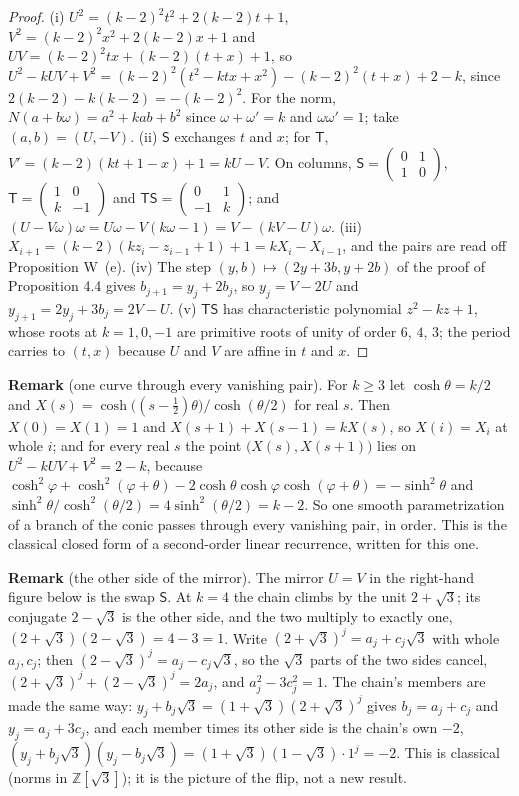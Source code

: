 \documentclass[11pt]{article}
\begin{document}
\begin{proof}
(i) $U^2=(k-2)^2t^2+2(k-2)t+1$, $V^2=(k-2)^2x^2+2(k-2)x+1$ and $UV=(k-2)^2tx+(k-2)(t+x)+1$, so $U^2-kUV+V^2=(k-2)^2(t^2-ktx+x^2)-(k-2)^2(t+x)+2-k$, since $2(k-2)-k(k-2)=-(k-2)^2$. For the norm, $N(a+b\omega)=a^2+kab+b^2$ since $\omega+\omega'=k$ and $\omega\omega'=1$; take $(a,b)=(U,-V)$. (ii) $\mathsf{S}$ exchanges $t$ and $x$; for $\mathsf{T}$, $V'=(k-2)(kt+1-x)+1=kU-V$. On columns, $\mathsf{S}=\begin{pmatrix}0&1\\1&0\end{pmatrix}$, $\mathsf{T}=\begin{pmatrix}1&0\\k&-1\end{pmatrix}$ and $\mathsf{T}\mathsf{S}=\begin{pmatrix}0&1\\-1&k\end{pmatrix}$; and $(U-V\omega)\omega=U\omega-V(k\omega-1)=V-(kV-U)\omega$. (iii) $X_{i+1}=(k-2)(kz_i-z_{i-1}+1)+1=kX_i-X_{i-1}$, and the pairs are read off Proposition W~(e). (iv) The step $(y,b)\mapsto(2y+3b,y+2b)$ of the proof of Proposition 4.4 gives $b_{j+1}=y_j+2b_j$, so $y_j=V-2U$ and $y_{j+1}=2y_j+3b_j=2V-U$. (v) $\mathsf{T}\mathsf{S}$ has characteristic polynomial $z^2-kz+1$, whose roots at $k=1,0,-1$ are primitive roots of unity of order $6$, $4$, $3$; the period carries to $(t,x)$ because $U$ and $V$ are affine in $t$ and $x$.
\end{proof}

\medskip
\noindent\textbf{Remark} (one curve through every vanishing pair). For $k\ge3$ let $\cosh\theta=k/2$ and $X(s)=\cosh\bigl((s-\frac12)\theta\bigr)/\cosh(\theta/2)$ for real $s$. Then $X(0)=X(1)=1$ and $X(s+1)+X(s-1)=kX(s)$, so $X(i)=X_i$ at whole $i$; and for every real $s$ the point $\bigl(X(s),X(s+1)\bigr)$ lies on $U^2-kUV+V^2=2-k$, because $\cosh^2\varphi+\cosh^2(\varphi+\theta)-2\cosh\theta\cosh\varphi\cosh(\varphi+\theta)=-\sinh^2\theta$ and $\sinh^2\theta/\cosh^2(\theta/2)=4\sinh^2(\theta/2)=k-2$. So one smooth parametrization of a branch of the conic passes through every vanishing pair, in order. This is the classical closed form of a second-order linear recurrence, written for this one.

\medskip
\noindent\textbf{Remark} (the other side of the mirror). The mirror $U=V$ in the right-hand figure below is the swap $\mathsf{S}$. At $k=4$ the chain climbs by the unit $2+\sqrt3$; its conjugate $2-\sqrt3$ is the other side, and the two multiply to exactly one, $(2+\sqrt3)(2-\sqrt3)=4-3=1$. Write $(2+\sqrt3)^j=a_j+c_j\sqrt3$ with whole $a_j,c_j$; then $(2-\sqrt3)^j=a_j-c_j\sqrt3$, so the $\sqrt3$ parts of the two sides cancel, $(2+\sqrt3)^j+(2-\sqrt3)^j=2a_j$, and $a_j^2-3c_j^2=1$. The chain's members are made the same way: $y_j+b_j\sqrt3=(1+\sqrt3)(2+\sqrt3)^j$ gives $b_j=a_j+c_j$ and $y_j=a_j+3c_j$, and each member times its other side is the chain's own $-2$, $(y_j+b_j\sqrt3)(y_j-b_j\sqrt3)=(1+\sqrt3)(1-\sqrt3)\cdot1^j=-2$. This is classical (norms in $\mathbb{Z}[\sqrt3]$); it is the picture of the flip, not a new result.
\end{document}
